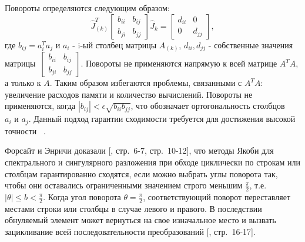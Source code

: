 Повороты определяются следующим образом: 
 \begin{equation} \label{one-sided Jacobi}
 \hat{J}^T_{(k)}\begin{bmatrix}
     b_{ii}&b_{ij}\\
     b_{ji}&b_{jj}
 \end{bmatrix}
 \hat{J}_{k} = \begin{bmatrix}
     d_{ii}&0\\
     0&d_{jj}
 \end{bmatrix},
 \end{equation}
 где $b_{ij} = a^T_ia_j$ и $a_i$ - i-ый столбец матрицы $A_{(k)}$, $d_{ii}, d_{jj}$ - собственные значения матрицы~$\begin{bmatrix}
      b_{ii}&b_{ij}\\
     b_{ji}&b_{jj}
 \end{bmatrix}$. 
Повороты не применяются напрямую к всей матрице $A^TA$, а только к $A$. Таким образом избегаются проблемы, связанными с $A^TA$: увеличение расходов памяти и количество вычислений. Повороты не применяются, когда $|b_{ij}| < \epsilon\sqrt{b_{ii}b_{jj}}$, что обозначает ортогональность столбцов $a_i\text{ и } a_j$.
Данный подход гарантии сходимости требуется для достижения высокой точности ~\cite{Dongarra2018}.

Форсайт и Энричи доказали [, стр.~6-7, стр.~10-12], что методы Якоби для спектрального и сингулярного разложения при обходе циклически по строкам или столбцам гарантированно сходятся, если можно выбрать углы поворота так, чтобы они оставались ограниченными значением строго меньшим $\frac{\pi}{2}$, т.е. $\left|\theta\right| \le b <\frac{\pi}{2}$. Когда угол поворота $\theta = \frac{\pi}{2}$, соответствующий поворот переставляет местами строки или столбцы в случае левого и правого. В последствии обнуляемый элемент может вернуться на свое изначальное место и вызвать зацикливание всей последовательности преобразований [, стр.~16-17].

